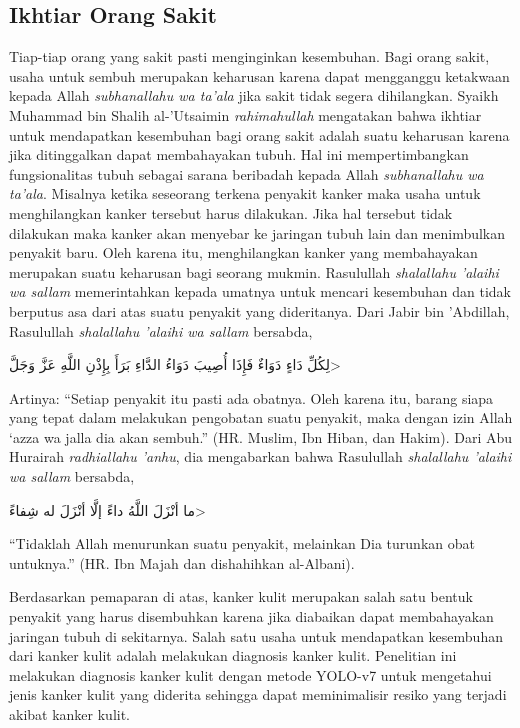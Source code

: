     \subsection{Ikhtiar Orang Sakit}
    Tiap-tiap orang yang sakit pasti menginginkan kesembuhan. Bagi orang sakit, usaha untuk sembuh merupakan keharusan karena dapat mengganggu ketakwaan kepada Allah \textit{subhanallahu wa ta'ala} jika sakit tidak segera dihilangkan. Syaikh Muhammad bin Shalih al-'Utsaimin \textit{rahimahullah} mengatakan bahwa ikhtiar untuk mendapatkan kesembuhan bagi orang sakit adalah suatu keharusan karena jika ditinggalkan dapat membahayakan tubuh. Hal ini mempertimbangkan fungsionalitas tubuh sebagai sarana beribadah kepada Allah \textit{subhanallahu wa ta'ala}. Misalnya ketika seseorang terkena penyakit kanker maka usaha untuk menghilangkan kanker tersebut harus dilakukan. Jika hal tersebut tidak dilakukan maka kanker akan menyebar ke jaringan tubuh lain dan menimbulkan penyakit baru. Oleh karena itu, menghilangkan kanker yang membahayakan merupakan suatu keharusan bagi seorang mukmin. Rasulullah \textit{shalallahu 'alaihi wa sallam} memerintahkan kepada umatnya untuk mencari kesembuhan dan tidak berputus asa dari atas suatu penyakit yang dideritanya. Dari Jabir bin 'Abdillah, Rasulullah \textit{shalallahu 'alaihi wa sallam} bersabda,

    \begin{flushright}
        \<لِكُلِّ دَاءٍ دَوَاءٌ فَإِذَا أُصِيبَ دَوَاءُ الدَّاءِ بَرَأَ بِإِذْنِ اللَّهِ عَزَّ وَجَلَّ>
    \end{flushright}

    Artinya: “Setiap penyakit itu pasti ada obatnya. Oleh karena itu, barang siapa yang tepat dalam melakukan pengobatan suatu penyakit, maka dengan izin Allah ‘azza wa  jalla dia akan sembuh.” (HR. Muslim, Ibn Hiban, dan Hakim). Dari Abu Hurairah \textit{radhiallahu 'anhu}, dia mengabarkan bahwa Rasulullah \textit{shalallahu 'alaihi wa sallam} bersabda,

    \begin{flushright}
        \<ما أنْزَلَ اللَّهُ داءً إلَّا أنْزَلَ له شِفاءً>
    \end{flushright}

    “Tidaklah Allah menurunkan suatu penyakit, melainkan Dia turunkan obat untuknya.” (HR. Ibn Majah dan dishahihkan al-Albani).

    Berdasarkan pemaparan di atas, kanker kulit merupakan salah satu bentuk penyakit yang harus disembuhkan karena jika diabaikan dapat membahayakan jaringan tubuh di sekitarnya. Salah satu usaha untuk mendapatkan kesembuhan dari kanker kulit adalah melakukan diagnosis kanker kulit. Penelitian ini melakukan diagnosis kanker kulit dengan metode YOLO-v7 untuk mengetahui jenis kanker kulit yang diderita sehingga dapat meminimalisir resiko yang terjadi akibat kanker kulit.








